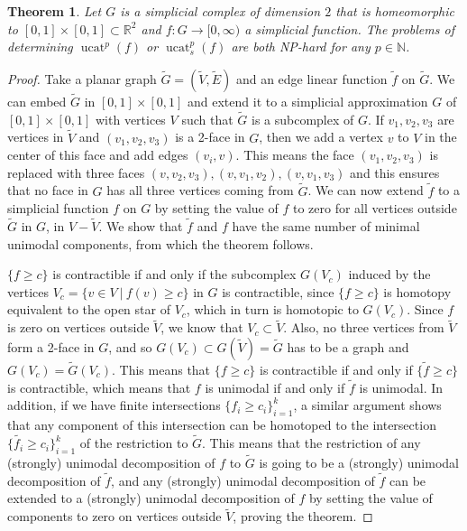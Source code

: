 \documentclass[11pt]{article}
\DeclareMathOperator{\ucat}{ucat}
\newtheorem{thm}{Theorem}[section]
\newcommand{\R}{\ensuremath{\mathbb{R}}}
\begin{document}
\begin{thm}
\label{thm:highd}
Let $G$ is a simplicial complex of dimension $2$ that is homeomorphic to $[0,1]\times[0,1] \subset \R^2$ and $f : G \rightarrow [0,\infty)$ a simplicial function. The problems of determining $\ucat^p(f)$ or $\ucat_s^p(f)$ are both NP-hard for any $p \in \mathbb{N}$.
\end{thm}
\begin{proof}
Take a planar graph $\tilde{G} = (\tilde{V}, \tilde{E})$ and an edge linear function $\tilde{f}$ on $\tilde{G}$. We can embed $\tilde{G}$ in $[0,1]\times[0,1]$ and extend it to a simplicial approximation $G$ of $[0,1]\times[0,1]$ with vertices $V$ such that $\tilde{G}$ is a subcomplex of $G$. If $v_1, v_2, v_3$ are vertices in $\tilde{V}$ and $(v_1,v_2,v_3)$ is a 2-face in $G$, then we add a vertex $v$ to $V$ in the center of this face and add edges $(v_i, v)$. This means the face $(v_1,v_2,v_3)$ is replaced with three faces $(v,v_2,v_3), (v,v_1,v_2), (v,v_1,v_3)$ and this ensures that no face in $G$ has all three vertices coming from $\tilde{G}$. We can now extend $\tilde{f}$ to a simplicial function $f$ on $G$ by setting the value of $f$ to zero for all vertices outside $\tilde{G}$ in $G$, in $V-\tilde{V}$. We show that $\tilde{f}$ and $f$ have the same number of minimal unimodal components, from which the theorem follows.

$\{f \geq c\}$ is contractible if and only if the subcomplex $G(V_c)$ induced by the vertices $V_c = \{ v \in V \ | \ f(v) \geq c\}$ in $G$ is contractible, since $\{f \geq c\}$ is homotopy equivalent to the open star of $V_c$, 
which in turn is homotopic to $G(V_c)$. Since $f$ is zero on vertices outside $\tilde{V}$, we know that $V_c \subset \tilde{V}$. Also, no three vertices from $\tilde{V}$ form a 2-face in $G$, and so $G(V_c) \subset G(\tilde{V}) = \tilde{G} $ 
has to be a graph and $G(V_c) = \tilde{G}(V_c)$. This means that $\{f \geq c\}$ is contractible if and only if $\{ \tilde{f} \geq c \}$ is contractible, which means that $f$ is unimodal if and only if $\tilde{f}$ is unimodal. In addition, if we have finite intersections $\{ f_i \geq c_i \}_{i=1}^{k}$, a similar argument shows that any component of this intersection can be homotoped to the intersection $\{ \tilde{f_i} \geq c_i \}_{i=1}^{k}$ of the restriction to $\tilde{G}$.
This means that the restriction of any (strongly) unimodal 
decomposition of $f$ to $\tilde{G}$ is going to be a (strongly) unimodal decomposition of $\tilde{f}$, and any (strongly) unimodal decomposition of $\tilde{f}$ can be extended to a (strongly) unimodal decomposition of $f$ by setting the value of components to zero on vertices outside $\tilde{V}$, proving the theorem.


\end{proof}
\end{document}
